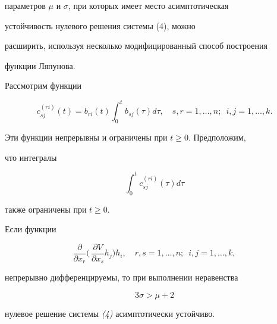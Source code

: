 параметров $\mu$ и $\sigma$, при которых имеет место асимптотическая 


устойчивость нулевого решения системы (4), можно 


расширить, используя несколько модифицированный способ построения 


функции Ляпунова. 


 


Рассмотрим функции 


$$ 


c^{(ri)}_{sj}(t)=b_{ri}(t)\int^t_0 b_{sj}(\tau)d\tau,\quad 


s,r=1,\dotsc,n; \ \; i,j=1,\dotsc,k. 


$$ 


Эти функции непрерывны и ограничены при $t\ge 0$. Предположим, 


что интегралы 


\begin{equation} 


\int^t_0 c^{(ri)}_{sj}(\tau)d\tau 


\end{equation} 


также ограничены при $t\ge 0$. 


 


\begin{thm} Если функции 


$$ 


\frac{\partial}{\partial x_r}\biggl(\, 


\frac{\partial V}{\partial x_s}h_j\biggr)h_i,\quad 


r,s=1,\dotsc,n; \ \; i,j=1,\dotsc,k, 


$$ 


непрерывно дифференцируемы, то при выполнении неравенства 


\begin{equation} 


3\sigma>\mu+2 


\end{equation} 


нулевое решение системы {\em (4)} асимптотически устойчиво. 


\end{thm} 


 


